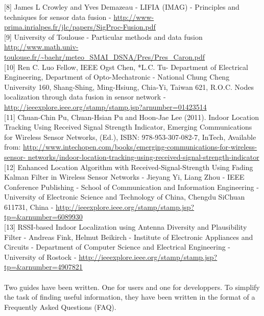\documentclass[a4paper,10pt]{article}
\begin{document}
{[8]}
James L Crowley and Yves Demazeau - 
LIFIA (IMAG) - 
Principles and techniques for sensor data fusion - 
\url{http://www-prima.inrialpes.fr/jlc/papers/SigProc-Fusion.pdf}\\
{[9]}
University of Toulouse - 
Particular methods and data fusion\\
\url{http://www.math.univ-toulouse.fr/~baehr/meteo_SMAI_DSNA/Pres/Pres_Caron.pdf}\\
{[10]}
Ren C. Luo Fellow, IEEE Ogst Chen, *L.C. Tu-
Department of Electrical Engineering, Department of Opto-Mechatronic - 
National Chung Cheng University 160, Shang-Shing, Ming-Hsiung, Chia-Yi, Taiwan 621, R.O.C. 
Nodes localization through data fusion in sensor network - 
\url{http://ieeexplore.ieee.org/stamp/stamp.jsp?arnumber=01423514}\\
{[11]}
Chuan-Chin Pu, Chuan-Hsian Pu and Hoon-Jae Lee (2011). Indoor Location Tracking Using Received Signal
Strength Indicator, Emerging Communications for Wireless Sensor Networks, (Ed.), ISBN: 978-953-307-082-7,
InTech, Available from: \url{http://www.intechopen.com/books/emerging-communications-for-wireless-sensor-
networks/indoor-location-tracking-using-received-signal-strength-indicator} \\
{[12]}
Enhanced Location Algorithm with Received-Signal-Strength Using Fading Kalman Filter in Wireless Sensor Networks - 
Jieyang Yi, Liang Zhou - 
IEEE Conference Publishing - 
School of Communication and Information Engineering - 
University of Electronic Science and Technology of China, Chengdu SiChuan 611731, China - 
\url{http://ieeexplore.ieee.org/stamp/stamp.jsp?tp=&arnumber=6089930}\\
{[13]}
RSSI-based Indoor Localization using Antenna Diversity and Plausibility Filter -
Andreas Fink, Helmut Beikirch -
Institute of Electronic Appliances and Circuits -
Department of Computer Science and Electrical Engineering - 
University of Rostock -
\url{http://ieeexplore.ieee.org/stamp/stamp.jsp?tp=&arnumber=4907821}
\newpage 
\appendix
\appendixname
\\ \\Two guides have been written. One for users and one for developpers. To simplify the task of finding useful information, they have been written
in the format of a Frequently Asked Questions (FAQ).
\end{document}

